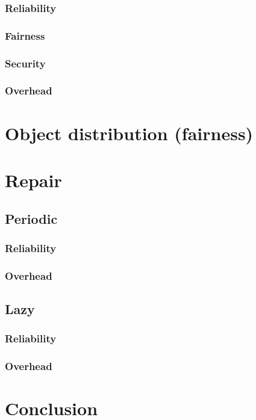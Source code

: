                 \subsubsection{Reliability}
                \subsubsection{Fairness}
                \subsubsection{Security}
                \subsubsection{Overhead}

\section{Object distribution (fairness)}

    \section{Repair}
            \subsection{Periodic}
                \subsubsection{Reliability}
                \subsubsection{Overhead}
            \subsection{Lazy}
                \subsubsection{Reliability}
                \subsubsection{Overhead}

\section{Conclusion}
